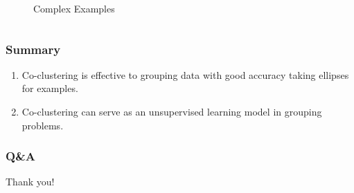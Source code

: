 \documentclass[aspectratio=169]{beamer}
\begin{document}
\begin{frame}
\begin{columns}
\begin{column}{.4\linewidth}
\begin{figure}[htbp]
{                    }
                    \caption{Complex Examples}
                \end{figure}
            \end{column}
        \end{columns}
        

    \end{frame}



    \begin{frame}
        \frametitle{Summary}
    
        \begin{enumerate}
            \item Co-clustering is effective to grouping data with good accuracy taking ellipses for examples. 
            \item Co-clustering can serve as an unsupervised learning model in grouping problems.
            
        \end{enumerate}
    
    \end{frame}
    \begin{frame}
        \frametitle{Q\&A}
    
        Thank you!
    
    \end{frame}
\end{document}
